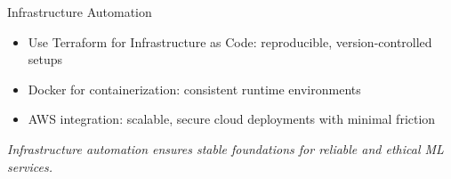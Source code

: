 \documentclass[aspectratio=169]{beamer}
\begin{document}
%
%
\begin{frame}{Infrastructure Automation}
\begin{itemize}
\item Use Terraform for Infrastructure as Code: reproducible, version-controlled setups
\item Docker for containerization: consistent runtime environments
\item AWS integration: scalable, secure cloud deployments with minimal friction
\end{itemize}

\vspace{0.8em}
\emph{Infrastructure automation ensures stable foundations for reliable and ethical ML services.}

\end{frame}
\end{document}
